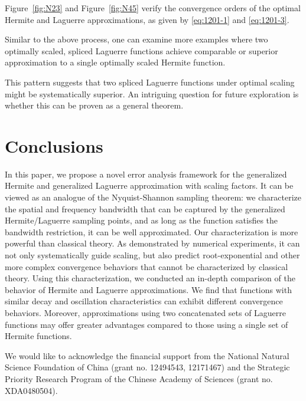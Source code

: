 \documentclass[pdflatex,sn-aps]{sn-jnl}%
\theoremstyle{thmstyleone}%
\theoremstyle{thmstyletwo}%
\theoremstyle{thmstylethree}%
\begin{document}
Figure~\ref{fig:N23} and Figure~\ref{fig:N45} verify the convergence orders 
of the optimal Hermite and Laguerre approximations, as given by \eqref{eq:1201-1} and \eqref{eq:1201-3}.

Similar to the above process, one can examine more examples where two optimally scaled, spliced Laguerre functions achieve comparable or superior approximation to a single optimally scaled Hermite function.

This pattern suggests that two spliced Laguerre functions 
under optimal scaling might be systematically superior. 
An intriguing question for future exploration is whether 
this can be proven as a general theorem.

\section{Conclusions}
\label{sec:conclusion}
In this paper, we propose a novel error analysis framework for the generalized Hermite and generalized  Laguerre approximation with scaling factors. 
It can be viewed as an analogue of the Nyquist-Shannon sampling theorem: 
we characterize the spatial and frequency bandwidth that can be 
captured by the generalized Hermite/Laguerre sampling points, and as long as the 
function satisfies the bandwidth restriction, it can be well approximated. Our characterization is 
more powerful than classical theory. As demonstrated by numerical experiments, it can not only systematically guide scaling, but also predict root-exponential and other more complex convergence behaviors
that cannot be characterized by classical theory. Using this characterization, we conducted an in-depth comparison of the behavior of Hermite and Laguerre approximations.
We find that functions with similar decay and oscillation characteristics can exhibit different convergence behaviors. Moreover, approximations using two concatenated sets of Laguerre functions may offer greater advantages compared to those using a single set of Hermite functions.

\backmatter


We would like to acknowledge the financial support from the National Natural Science Foundation of China (grant
no. 12494543, 12171467) and
the Strategic Priority Research Program of the Chinese Academy of Sciences (grant no. XDA0480504).
\end{document}
